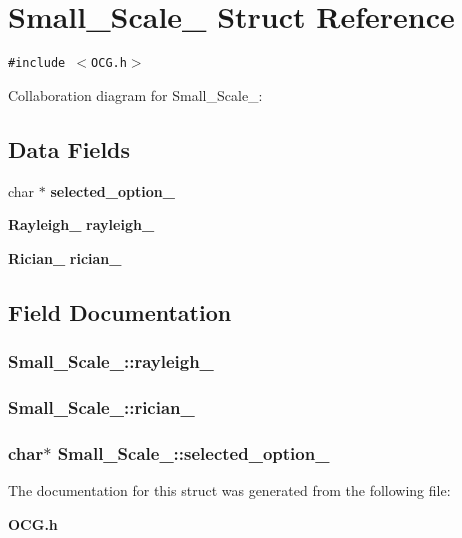 \section{Small\_\-Scale\_\- Struct Reference}
\label{structSmall__Scale__}
{\tt \#include $<$OCG.h$>$}

Collaboration diagram for Small\_\-Scale\_\-:\subsection*{Data Fields}
\begin{CompactItemize}
\item 
char $\ast$ {\bf selected\_\-option\_\-}
\item 
{\bf Rayleigh\_\-} {\bf rayleigh\_\-}
\item 
{\bf Rician\_\-} {\bf rician\_\-}
\end{CompactItemize}


\subsection{Field Documentation}
\subsubsection[{rayleigh\_\-}]{ {\bf Small\_\-Scale\_\-::rayleigh\_\-}}\label{structSmall__Scale___6eb68c140854666058fd3b4f696888d1}


\subsubsection[{rician\_\-}]{ {\bf Small\_\-Scale\_\-::rician\_\-}}\label{structSmall__Scale___06dc1233701c97d632e4265da9a9e1b2}


\subsubsection[{selected\_\-option\_\-}]{\setlength{\rightskip}{0pt plus 5cm}char$\ast$ {\bf Small\_\-Scale\_\-::selected\_\-option\_\-}}\label{structSmall__Scale___76d1b73edff2b339a62bf8d942e0672a}




The documentation for this struct was generated from the following file:\begin{CompactItemize}
\item 
{\bf OCG.h}\end{CompactItemize}
